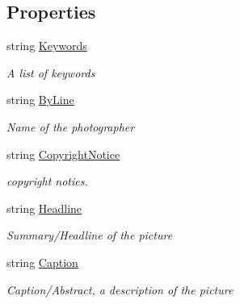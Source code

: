 \subsection*{Properties}
\begin{DoxyCompactItemize}
\item 
string \mbox{\hyperlink{class_pic_d_b_1_1_models_1_1_i_p_t_c_view_model_a6abcbb58c1a4b9f8ddda13046da6cf32}{Keywords}}
\begin{DoxyCompactList}\small\item\em A list of keywords \end{DoxyCompactList}\item 
string \mbox{\hyperlink{class_pic_d_b_1_1_models_1_1_i_p_t_c_view_model_a173ae4901e4986c9303cd45398fae36a}{By\+Line}}
\begin{DoxyCompactList}\small\item\em Name of the photographer \end{DoxyCompactList}\item 
string \mbox{\hyperlink{class_pic_d_b_1_1_models_1_1_i_p_t_c_view_model_a8c7719273ffbea40932a1aa8a2a8bd36}{Copyright\+Notice}}
\begin{DoxyCompactList}\small\item\em copyright noties. \end{DoxyCompactList}\item 
string \mbox{\hyperlink{class_pic_d_b_1_1_models_1_1_i_p_t_c_view_model_a5ca4be5d97634ba33caeaa1f7440b4a4}{Headline}}
\begin{DoxyCompactList}\small\item\em Summary/\+Headline of the picture \end{DoxyCompactList}\item 
string \mbox{\hyperlink{class_pic_d_b_1_1_models_1_1_i_p_t_c_view_model_a4722980ba1f913302a3c79ede62f2cb0}{Caption}}
\begin{DoxyCompactList}\small\item\em Caption/\+Abstract, a description of the picture \end{DoxyCompactList}\end{DoxyCompactItemize}


